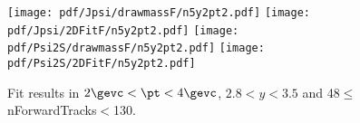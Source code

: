 \begin{figure}[H]
\begin{center}
\texttt{[image: pdf/Jpsi/drawmassF/n5y2pt2.pdf]}
\texttt{[image: pdf/Jpsi/2DFitF/n5y2pt2.pdf]}
\vspace*{-0.5cm}
\texttt{[image: pdf/Psi2S/drawmassF/n5y2pt2.pdf]}
\texttt{[image: pdf/Psi2S/2DFitF/n5y2pt2.pdf]}
\vspace*{-0.5cm}
\end{center}
\caption{Fit results in $2\gevc<\pt<4\gevc$, $2.8<y<3.5$ and 48$\leq$nForwardTracks$<$130.}
\label{Fitn5y2pt2}
\end{figure}

